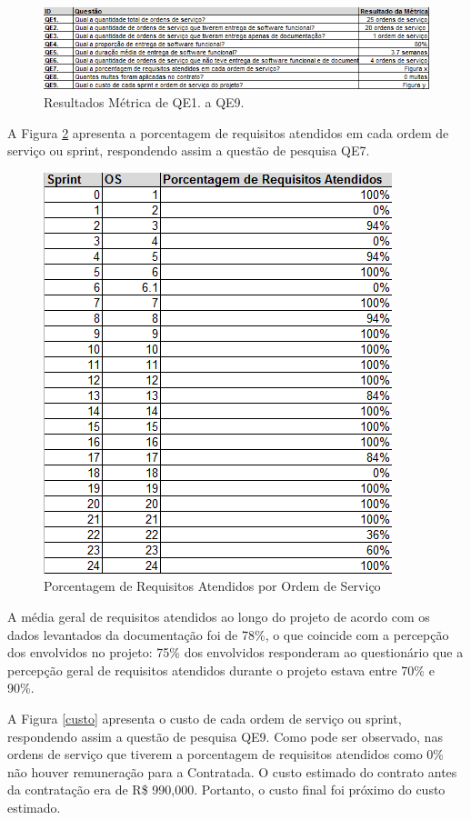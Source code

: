 \begin{figure}[H]
		\centering
			\includegraphics[scale=1.0]{figuras/resultadosmetricas.png}
		\caption{Resultados Métrica de QE1. a QE9.}
		\label{resultadosmetricas}
\end{figure}

A Figura \ref{porcentagemrequisitos} apresenta a porcentagem de requisitos atendidos em cada ordem de serviço ou sprint, respondendo assim a questão de pesquisa QE7.

\begin{figure}[H]
		\centering
			\includegraphics[scale=1.0]{figuras/porcentagemrequisitos.png}
		\caption{Porcentagem de Requisitos Atendidos por Ordem de Serviço}
		\label{porcentagemrequisitos}
\end{figure}

 A média geral de requisitos atendidos ao longo do projeto de acordo com os dados levantados da documentação foi de 78\%, o que coincide com a percepção dos envolvidos no projeto: 75\% dos envolvidos responderam ao questionário que a percepção geral de requisitos atendidos durante o projeto estava entre 70\% e 90\%.

A Figura \ref{custo} apresenta o custo de cada ordem de serviço ou sprint, respondendo assim a questão de pesquisa QE9. Como pode ser observado, nas ordens de serviço que tiverem a porcentagem de requisitos atendidos como 0\% não houver remuneração para a Contratada. O custo estimado do contrato antes da contratação era de R\$ 990,000. Portanto, o custo final foi próximo do custo estimado.

